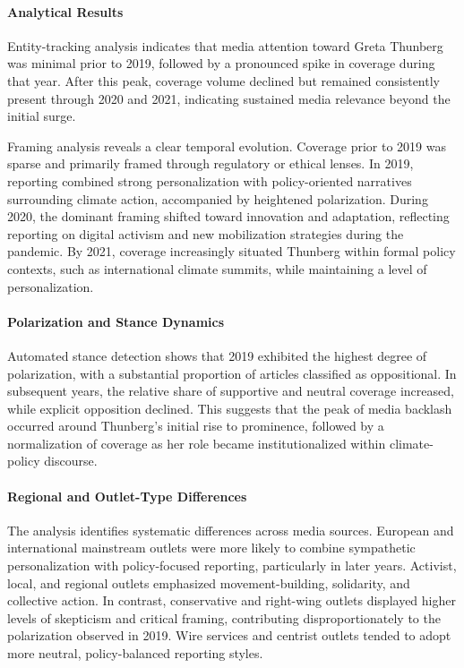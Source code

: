 \paragraph{Analytical Results}

Entity-tracking analysis indicates that media attention toward Greta Thunberg was minimal prior to 2019, followed by a pronounced spike in coverage during that year. After this peak, coverage volume declined but remained consistently present through 2020 and 2021, indicating sustained media relevance beyond the initial surge.

Framing analysis reveals a clear temporal evolution. Coverage prior to 2019 was sparse and primarily framed through regulatory or ethical lenses. In 2019, reporting combined strong personalization with policy-oriented narratives surrounding climate action, accompanied by heightened polarization. During 2020, the dominant framing shifted toward innovation and adaptation, reflecting reporting on digital activism and new mobilization strategies during the pandemic. By 2021, coverage increasingly situated Thunberg within formal policy contexts, such as international climate summits, while maintaining a level of personalization.

\paragraph{Polarization and Stance Dynamics}

Automated stance detection shows that 2019 exhibited the highest degree of polarization, with a substantial proportion of articles classified as oppositional. In subsequent years, the relative share of supportive and neutral coverage increased, while explicit opposition declined. This suggests that the peak of media backlash occurred around Thunberg’s initial rise to prominence, followed by a normalization of coverage as her role became institutionalized within climate-policy discourse.

\paragraph{Regional and Outlet-Type Differences}

The analysis identifies systematic differences across media sources. European and international mainstream outlets were more likely to combine sympathetic personalization with policy-focused reporting, particularly in later years. Activist, local, and regional outlets emphasized movement-building, solidarity, and collective action. In contrast, conservative and right-wing outlets displayed higher levels of skepticism and critical framing, contributing disproportionately to the polarization observed in 2019. Wire services and centrist outlets tended to adopt more neutral, policy-balanced reporting styles.

